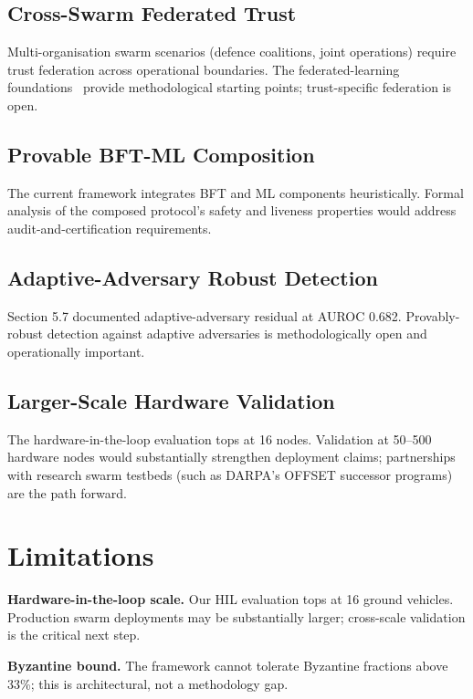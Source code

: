 \documentclass[sigconf,nonacm]{acmart}
\begin{document}
\subsection{Cross-Swarm Federated Trust}

Multi-organisation swarm scenarios (defence coalitions, joint
operations) require trust federation across operational boundaries.
The federated-learning foundations~\cite{kairouz2024fedml} provide
methodological starting points; trust-specific federation is
open.

\subsection{Provable BFT-ML Composition}

The current framework integrates BFT and ML components
heuristically. Formal analysis of the composed protocol's safety
and liveness properties would address audit-and-certification
requirements.

\subsection{Adaptive-Adversary Robust Detection}

Section 5.7 documented adaptive-adversary residual at AUROC
0.682. Provably-robust detection against adaptive adversaries
is methodologically open and operationally important.

\subsection{Larger-Scale Hardware Validation}

The hardware-in-the-loop evaluation tops at 16 nodes. Validation
at 50--500 hardware nodes would substantially strengthen
deployment claims; partnerships with research swarm testbeds
(such as DARPA's OFFSET successor programs) are the path
forward.

\section{Limitations}

\textbf{Hardware-in-the-loop scale.} Our HIL evaluation tops at 16
ground vehicles. Production swarm deployments may be substantially
larger; cross-scale validation is the critical next step.

\textbf{Byzantine bound.} The framework cannot tolerate Byzantine
fractions above 33\%; this is architectural, not a
methodology gap.
\end{document}
